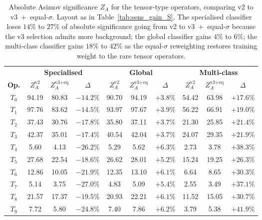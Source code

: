 \begin{table}[htbp]
  \centering
  \caption{Absolute Asimov significance $Z_A$ for the tensor-type operators, comparing v2 to v3~+~equal-$\sigma$. Layout as in Table~\ref{tab:sens_gain_S}. The specialised classifier loses $14\%$ to $27\%$ of absolute significance going from v2 to v3~+~equal-$\sigma$ because the v3 selection admits more background; the global classifier gains $4\%$ to $6\%$; the multi-class classifier gains $18\%$ to $42\%$ as the equal-$\sigma$ reweighting restores training weight to the rare tensor operators.}
  \label{tab:sens_gain_T}
  \begin{tabular}{|c|cc|c|cc|c|cc|c|}
    \hline
    & \multicolumn{3}{c|}{\textbf{Specialised}} & \multicolumn{3}{c|}{\textbf{Global}} & \multicolumn{3}{c|}{\textbf{Multi-class}} \\
    \textbf{Op.} & $Z_A^\text{v2}$ & $Z_A^\text{v3+eq}$ & $\Delta$ & $Z_A^\text{v2}$ & $Z_A^\text{v3+eq}$ & $\Delta$ & $Z_A^\text{v2}$ & $Z_A^\text{v3+eq}$ & $\Delta$ \\
    \hline
    $T_0$ & 94.19 & 80.83 & $-14.2\%$ & 90.70 & 94.19 & $+3.8\%$ & 54.42 & 63.98 & $+17.6\%$ \\
    $T_1$ & 97.76 & 83.62 & $-14.5\%$ & 93.97 & 97.67 & $+3.9\%$ & 56.22 & 66.91 & $+19.0\%$ \\
    $T_2$ & 37.43 & 30.76 & $-17.8\%$ & 35.80 & 37.11 & $+3.7\%$ & 21.30 & 25.85 & $+21.4\%$ \\
    $T_3$ & 42.37 & 35.01 & $-17.4\%$ & 40.54 & 42.04 & $+3.7\%$ & 24.07 & 29.35 & $+21.9\%$ \\
    $T_4$ &  5.60 &  4.13 & $-26.2\%$ &  5.29 &  5.62 & $+6.3\%$ &  2.73 &  3.78 & $+38.3\%$ \\
    $T_5$ & 27.68 & 22.54 & $-18.6\%$ & 26.62 & 28.01 & $+5.2\%$ & 15.24 & 19.25 & $+26.3\%$ \\
    $T_6$ & 12.86 & 10.05 & $-21.9\%$ & 12.35 & 13.10 & $+6.1\%$ &  6.64 &  8.65 & $+30.3\%$ \\
    $T_7$ &  5.14 &  3.75 & $-27.0\%$ &  4.83 &  5.09 & $+5.4\%$ &  2.55 &  3.49 & $+37.1\%$ \\
    $T_8$ & 21.57 & 17.37 & $-19.5\%$ & 20.93 & 22.21 & $+6.1\%$ & 11.52 & 15.05 & $+30.7\%$ \\
    $T_9$ &  7.72 &  5.80 & $-24.8\%$ &  7.40 &  7.86 & $+6.2\%$ &  3.79 &  5.38 & $+41.9\%$ \\
    \hline
  \end{tabular}
\end{table}

